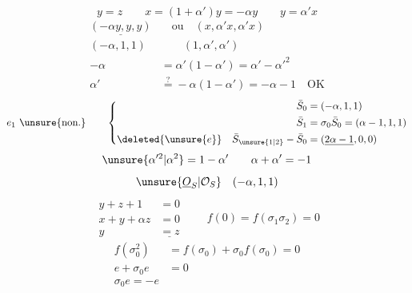 \[
y=z\qquad x=(1+\alpha')y=-\alpha y\qquad y=\alpha'x
\]
\[
\begin{aligned}
\underline{(-\alpha y,y,y)}&\quad\text{ou}\quad(x,\alpha'x,\alpha'x)\\
(-\alpha,1,1)&\qquad(1,\alpha',\alpha')\\
-\alpha&=\alpha'(1-\alpha')=\alpha'-\alpha'^2\\
\alpha'&\overset{?}{=}-\alpha(1-\alpha')=-\alpha-1\quad\text{OK}
\end{aligned}
\]
\[
e_1\ \unsure{\text{non.}}\qquad
\left\{\begin{aligned}
\bar S_0&=(-\alpha,1,1)\\
\bar S_1&=\sigma_0\bar S_0=(\alpha-1,1,1)\\
\deleted{\unsure{e}}\quad\bar S_{\unsure{1|2}}-\bar S_0&=(\underline{2\alpha-1},0,0)
\end{aligned}\right.
\]
\[
\unsure{\alpha'^2|\alpha^2}=1-\alpha'\qquad \alpha+\alpha'=-1
\]
\[
\unsure{\underline{O}_S|\mathcal O_S}\quad(-\alpha,1,1)
\]
\[
\begin{aligned}y+z+1&=0\\x+y+\alpha z&=0\\y&\underline{=z}\end{aligned}
\qquad f(0)=f(\sigma_1\sigma_2)=0
\]
\[
\begin{aligned}f(\sigma_0^2)&=f(\sigma_0)+\sigma_0f(\sigma_0)=0\\
e+\sigma_0e&=0\\\boxed{\sigma_0e=-e}
\end{aligned}
\]
